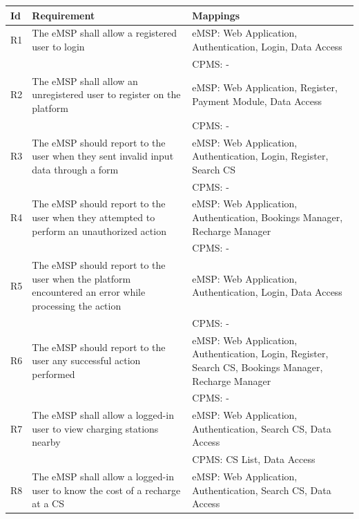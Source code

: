 \documentclass[11pt]{article}
\begin{document}
\begin{table}[H]
    \centering
    \setlength{\tabcolsep}{18pt}
    \renewcommand{\arraystretch}{1.2}
    \begin{tabularx}{\textwidth}{|>{\centering\hsize=0.15\hsize}X|>{\hsize=1.425\hsize}X|>{\hsize=1.425\hsize}X|}
        \hline
        \textbf{Id} & \textbf{Requirement} & \textbf{Mappings} \\
        \hline
        R1 & The eMSP shall allow a registered user to login & eMSP: Web Application, Authentication, Login, Data Access \\
        & & CPMS: - \\
        \hline
        R2 & The eMSP shall allow an unregistered user to register on the platform & eMSP: Web Application, Register, Payment Module, Data Access \\
        & & CPMS: - \\
        \hline
        R3 & The eMSP should report to the user when they sent invalid input data through a form & eMSP: Web Application, Authentication, Login, Register, Search CS \\
        & & CPMS: - \\
        \hline
        R4 & The eMSP should report to the user when they attempted to perform an unauthorized action & eMSP: Web Application, Authentication, Bookings Manager, Recharge Manager \\
        & & CPMS: - \\
        \hline
        R5 & The eMSP should report to the user when the platform encountered an error while processing the action & eMSP: Web Application, Authentication, Login, Data Access \\
        & & CPMS: - \\
        \hline
        R6 & The eMSP should report to the user any successful action performed & eMSP: Web Application, Authentication, Login, Register, Search CS, Bookings Manager, Recharge Manager \\
        & & CPMS: - \\
        \hline
        R7 & The eMSP shall allow a logged-in user to view charging stations nearby & eMSP: Web Application, Authentication, Search CS, Data Access \\
        & & CPMS: CS List, Data Access \\
        \hline
        R8 & The eMSP shall allow a logged-in user to know the cost of a recharge at a CS & eMSP: Web Application, Authentication, Search CS, Data Access \\

\end{tabularx}
\end{table}
\end{document}

